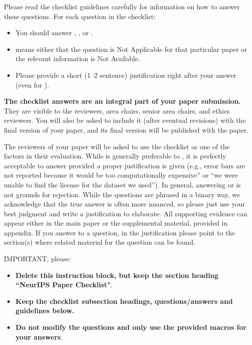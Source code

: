 \documentclass{article}
\theoremstyle{definition}
\theoremstyle{remark}
\theoremstyle{remark}
\begin{document}
Please read the checklist guidelines carefully for information on how to answer these questions. For each question in the checklist:
\begin{itemize}
    \item You should answer \answerYes{}, \answerNo{}, or \answerNA{}.
    \item \answerNA{} means either that the question is Not Applicable for that particular paper or the relevant information is Not Available.
    \item Please provide a short (1--2 sentence) justification right after your answer (even for \answerNA). 
\end{itemize}

{\bf The checklist answers are an integral part of your paper submission.} They are visible to the reviewers, area chairs, senior area chairs, and ethics reviewers. You will also be asked to include it (after eventual revisions) with the final version of your paper, and its final version will be published with the paper.

The reviewers of your paper will be asked to use the checklist as one of the factors in their evaluation. While \answerYes{} is generally preferable to \answerNo{}, it is perfectly acceptable to answer \answerNo{} provided a proper justification is given (e.g., error bars are not reported because it would be too computationally expensive'' or ``we were unable to find the license for the dataset we used''). In general, answering \answerNo{} or \answerNA{} is not grounds for rejection. While the questions are phrased in a binary way, we acknowledge that the true answer is often more nuanced, so please just use your best judgment and write a justification to elaborate. All supporting evidence can appear either in the main paper or the supplemental material, provided in appendix. If you answer \answerYes{} to a question, in the justification please point to the section(s) where related material for the question can be found.

IMPORTANT, please:
\begin{itemize}
    \item {\bf Delete this instruction block, but keep the section heading ``NeurIPS Paper Checklist"},
    \item  {\bf Keep the checklist subsection headings, questions/answers and guidelines below.}
    \item {\bf Do not modify the questions and only use the provided macros for your answers}.
\end{itemize} 
 
\end{document}
